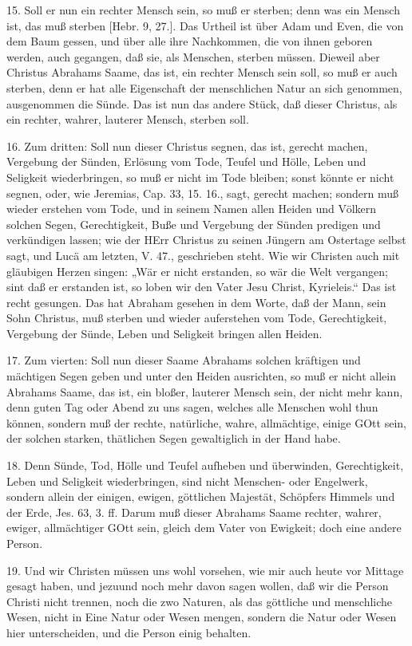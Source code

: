 15. Soll er nun ein rechter Mensch sein, so muß er sterben; denn was ein Mensch ist, das muß sterben [Hebr. 9, 27.]. Das Urtheil ist über Adam und Even, die von dem Baum gessen, und über alle ihre Nachkommen, die von ihnen geboren werden, auch gegangen, daß sie, als Menschen, sterben müssen. Dieweil aber Christus Abrahams Saame, das ist, ein rechter Mensch sein soll, so muß er auch sterben, denn er hat alle Eigenschaft der menschlichen Natur an sich genommen, ausgenommen die Sünde. Das ist nun das andere Stück, daß dieser Christus, als ein rechter, wahrer, lauterer Mensch, sterben soll.

16. Zum dritten: Soll nun dieser Christus segnen, das ist, gerecht machen, Vergebung der Sünden, Erlösung vom Tode, Teufel und Hölle, Leben und Seligkeit wiederbringen, so muß er nicht im Tode bleiben; sonst könnte er nicht segnen, oder, wie Jeremias, Cap. 33, 15. 16., sagt, gerecht machen; sondern muß wieder erstehen vom Tode, und in seinem Namen allen Heiden und Völkern solchen Segen, Gerechtigkeit, Buße und Vergebung der Sünden predigen und verkündigen lassen; wie der HErr Christus zu seinen Jüngern am Ostertage selbst sagt, und Lucä am letzten, V. 47., geschrieben steht. Wie wir Christen auch mit gläubigen Herzen singen: „Wär er nicht erstanden, so wär die Welt vergangen; sint daß er erstanden ist, so loben wir den Vater Jesu Christ, Kyrieleis.“ Das ist recht gesungen. Das hat Abraham gesehen in dem Worte, daß der Mann, sein Sohn Christus, muß sterben und wieder auferstehen vom Tode, Gerechtigkeit, Vergebung der Sünde, Leben und Seligkeit bringen allen Heiden.

17. Zum vierten: Soll nun dieser Saame Abrahams solchen kräftigen und mächtigen Segen geben und unter den Heiden ausrichten, so muß er nicht allein Abrahams Saame, das ist, ein bloßer, lauterer Mensch sein, der nicht mehr kann, denn guten Tag oder Abend zu uns sagen, welches alle Menschen wohl thun können, sondern muß der rechte, natürliche, wahre, allmächtige, einige GOtt sein, der solchen starken, thätlichen Segen gewaltiglich in der Hand habe.

18. Denn Sünde, Tod, Hölle und Teufel aufheben und überwinden, Gerechtigkeit, Leben und Seligkeit wiederbringen, sind nicht Menschen- oder Engelwerk, sondern allein der einigen, ewigen, göttlichen Majestät, Schöpfers Himmels und der Erde, Jes. 63, 3. ff. Darum muß dieser Abrahams Saame rechter, wahrer, ewiger, allmächtiger GOtt sein, gleich dem Vater von Ewigkeit; doch eine andere Person.

19. Und wir Christen müssen uns wohl vorsehen, wie mir auch heute vor Mittage gesagt haben, und jezuund noch mehr davon sagen wollen, daß wir die Person Christi nicht trennen, noch die zwo Naturen, als das göttliche und menschliche Wesen, nicht in Eine Natur oder Wesen mengen, sondern die Natur oder Wesen hier unterscheiden, und die Person einig behalten.


